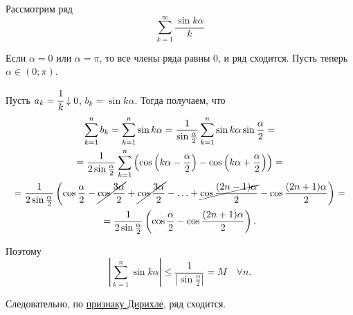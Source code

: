 \documentclass[../../main.tex]{subfiles}
\begin{document}
	\begin{example}
		Рассмотрим ряд
		\[\sum_{k = 1}^\infty\frac{\sin k\alpha}{k}\]
		
		Если $\alpha = 0$ или $\alpha = \pi$, то все члены ряда равны 0, и ряд сходится. Пусть теперь $\alpha\in (0;\pi)$. 
		
		Пусть $a_k = \cfrac{1}{k}\downarrow 0$, $b_k = \sin k\alpha$. Тогда получаем, что
		\begin{gather*}
			\sum_{k = 1}^n b_k = \sum_{k = 1}^n\sin k\alpha =
			\frac{1}{\sin\frac{\alpha}{2}}\sum_{k = 1}^n \sin k\alpha\sin\frac{\alpha}{2} = \\
			= \frac{1}{2\sin\frac{\alpha}{2}}\sum_{k = 1}^n\left(\cos\left(k\alpha - \frac{\alpha}{2}\right) - \cos\left(k\alpha + \frac{\alpha}{2}\right)\right) = \\
			= \frac{1}{2\sin\frac{\alpha}{2}}\left(\cos\frac{\alpha}{2} - \cancel{\cos\frac{3\alpha}{2}} + \cancel{\cos\frac{3\alpha}{2}} - \ldots + \cancel{\cos\frac{(2n - 1)\alpha}{2}} - \cos\frac{(2n + 1)\alpha}{2}\right) = \\
			= \frac{1}{2\sin\frac{\alpha}{2}}\left(\cos\frac{\alpha}{2} - \cos\frac{(2n + 1)\alpha}{2}\right).
		\end{gather*}
		
		Поэтому
		\[\left|\sum_{k = 1}^n \sin k\alpha\right|\leqslant \frac{1}{\left|\sin\frac{\alpha}{2}\right|} = M\quad \forall n.\]
		
		Следовательно, по \href{29:dirichle}{признаку Дирихле}, ряд сходится.
	\end{example}
\end{document}
